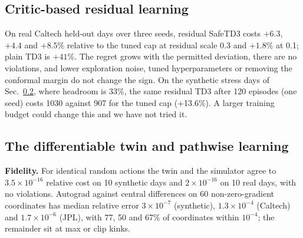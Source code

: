 \documentclass[11pt]{article}
\begin{document}
\subsection{Critic-based residual learning}\label{sec:rl}
On real Caltech held-out days over three seeds, residual SafeTD3 costs $+6.3$, $+4.4$ and $+8.5\%$ relative to the tuned cap at residual scale 0.3 and $+1.8\%$ at 0.1; plain TD3 is $+41\%$. The regret grows with the permitted deviation, there are no violations, and lower exploration noise, tuned hyperparameters or removing the conformal margin do not change the sign. On the synthetic stress days of Sec.~\ref{sec:twin}, where headroom is 33\%, the same residual TD3 after 120 episodes (one seed) costs 1030 against 907 for the tuned cap (+13.6\%). A larger training budget could change this and we have not tried it.

\subsection{The differentiable twin and pathwise learning}\label{sec:twin}
\textbf{Fidelity.} For identical random actions the twin and the simulator agree to $3.5\times10^{-16}$ relative cost on 10 synthetic days and $2\times10^{-16}$ on 10 real days, with no violations. Autograd against central differences on 60 non-zero-gradient coordinates has median relative error $3\times10^{-7}$ (synthetic), $1.3\times10^{-4}$ (Caltech) and $1.7\times10^{-6}$ (JPL), with 77, 50 and 67\% of coordinates within $10^{-4}$; the remainder sit at max or clip kinks.
\end{document}
